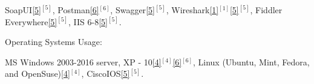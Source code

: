 \begin{cventries}
{\begin{cvitems}
{        \textcolor{rainbowcolor-olive}{SoapUI\ref{5}{$^{[5]}$}},
        \textcolor{rainbowcolor-olive}{Postman\ref{6}{$^{[6]}$}},
        \textcolor{rainbowcolor-olive}{Swagger\ref{5}{$^{[5]}$}},    
        \textcolor{rainbowcolor-olive}{Wireshark\ref{1}{$^{[1]}$}\ref{5}{$^{[5]}$}},    
        \textcolor{rainbowcolor-olive}{Fiddler Everywhere\ref{5}{$^{[5]}$}},  
        \textcolor{rainbowcolor-olive}{IIS 6-8\ref{5}{$^{[5]}$}}.%
		}
      \end{cvitems}
    }  
    
%    
%    
  \cventry
    {Operating Systems Usage:} %
    {} 
    {} 
    {} 
    {
      \vspace{0.1cm}
      \begin{cvitems} %
        \item[] {
        \textcolor{rainbowcolor-orange}{MS Windows 2003-2016 server, XP - 10\ref{4}{$^{[4]}$}\ref{6}{$^{[6]}$}}, 
        \textcolor{rainbowcolor-orange}{Linux (Ubuntu, Mint, Fedora, and OpenSuse)\ref{4}{$^{[4]}$}},
        \textcolor{rainbowcolor-orange}{CiscoIOS\ref{5}{$^{[5]}$}}.} 
      \end{cvitems}
    }  
  \vspace{-0.6cm} 
    


\end{cventries}
